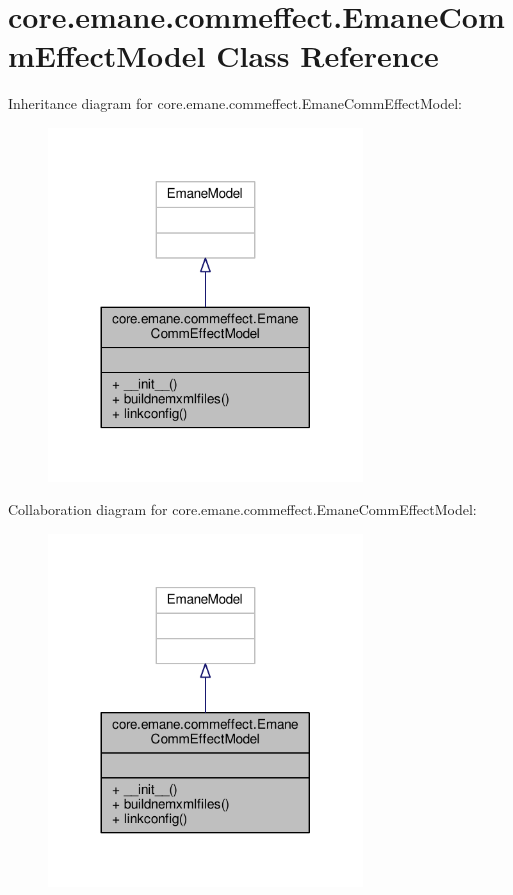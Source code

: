 \hypertarget{classcore_1_1emane_1_1commeffect_1_1_emane_comm_effect_model}{\section{core.\+emane.\+commeffect.\+Emane\+Comm\+Effect\+Model Class Reference}
\label{classcore_1_1emane_1_1commeffect_1_1_emane_comm_effect_model}
}


Inheritance diagram for core.\+emane.\+commeffect.\+Emane\+Comm\+Effect\+Model\+:
\nopagebreak
\begin{figure}[H]
\begin{center}
\leavevmode
\includegraphics[width=236pt]{classcore_1_1emane_1_1commeffect_1_1_emane_comm_effect_model__inherit__graph}
\end{center}
\end{figure}


Collaboration diagram for core.\+emane.\+commeffect.\+Emane\+Comm\+Effect\+Model\+:
\nopagebreak
\begin{figure}[H]
\begin{center}
\leavevmode
\includegraphics[width=236pt]{classcore_1_1emane_1_1commeffect_1_1_emane_comm_effect_model__coll__graph}
\end{center}
\end{figure}
